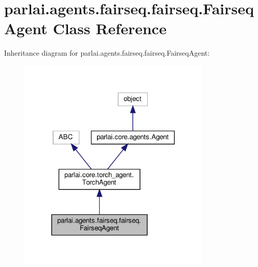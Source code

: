 \hypertarget{classparlai_1_1agents_1_1fairseq_1_1fairseq_1_1FairseqAgent}{}\section{parlai.\+agents.\+fairseq.\+fairseq.\+Fairseq\+Agent Class Reference}
\label{classparlai_1_1agents_1_1fairseq_1_1fairseq_1_1FairseqAgent}


Inheritance diagram for parlai.\+agents.\+fairseq.\+fairseq.\+Fairseq\+Agent\+:
\nopagebreak
\begin{figure}[H]
\begin{center}
\leavevmode
\includegraphics[width=260pt]{classparlai_1_1agents_1_1fairseq_1_1fairseq_1_1FairseqAgent__inherit__graph}
\end{center}
\end{figure}


